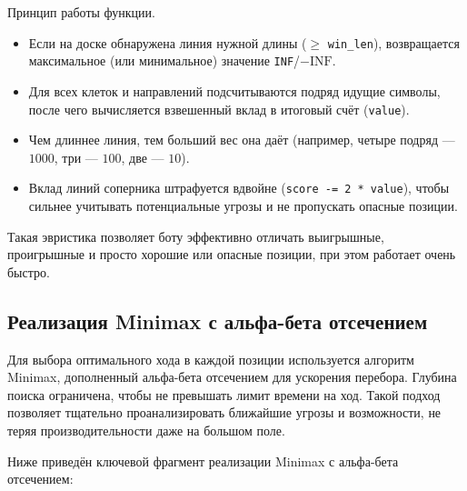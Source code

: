 \vspace{1ex}

\noindent Принцип работы функции.
\begin{itemize}
    \item Если на доске обнаружена линия нужной длины ($\geq$ \verb|win_len|), возвращается максимальное (или минимальное) значение \verb|INF|/$-\mathrm{INF}$.
    \item Для всех клеток и направлений подсчитываются подряд идущие символы, после чего вычисляется взвешенный вклад в итоговый счёт (\verb|value|).
    \item Чем длиннее линия, тем больший вес она даёт (например, четыре подряд — $1000$, три — $100$, две — $10$).
    \item Вклад линий соперника штрафуется вдвойне (\verb|score -= 2 * value|), чтобы сильнее учитывать потенциальные угрозы и не пропускать опасные позиции.
\end{itemize}

\vspace{1ex}

\noindent Такая эвристика позволяет боту эффективно отличать выигрышные, проигрышные и просто хорошие или опасные позиции, при этом работает очень быстро.

\subsection{Реализация Minimax с альфа-бета отсечением}

Для выбора оптимального хода в каждой позиции используется алгоритм Minimax, дополненный альфа-бета отсечением для ускорения перебора. Глубина поиска ограничена, чтобы не превышать лимит времени на ход. Такой подход позволяет тщательно проанализировать ближайшие угрозы и возможности, не теряя производительности даже на большом поле.

\vspace{1ex}

Ниже приведён ключевой фрагмент реализации Minimax с альфа-бета отсечением:

